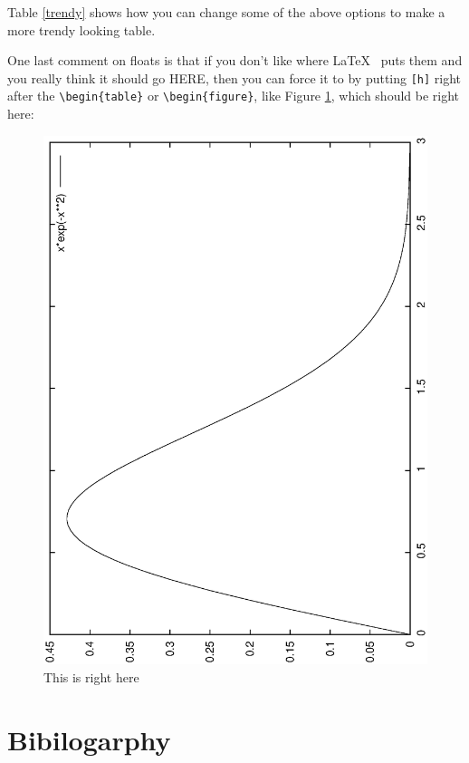 \documentclass[twocolumn,10 pt,showpacs,preprintnumbers,amsmath,amssymb]{revtex4-1}%
\begin{document}
Table \ref{trendy} shows how you can change some of the above options to make a more 
trendy looking table.

One last comment on floats is that if you don't like where \LaTeX~ puts them and you
really think it should go HERE, then you can force it to by putting \verb_[h]_ right
after the \verb_\begin{table}_ or \verb_\begin{figure}_, like Figure \ref{here}, which
should be right here:
\begin{figure}
  \begin{center}
    \caption{\label{here}This is right here}
    \includegraphics[scale=0.25,angle=-90]{graph.ps}
  \end{center}
\end{figure}

\section{Bibilogarphy}
\end{document}
